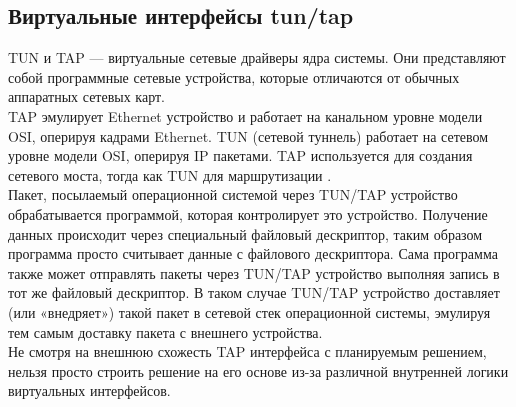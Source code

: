 \documentclass[14pt, a4paper]{extarticle}
\begin{document}
\subsection{Виртуальные интерфейсы tun/tap}
TUN и TAP — виртуальные сетевые драйверы ядра системы. Они представляют собой программные сетевые устройства, которые отличаются от обычных аппаратных сетевых карт. \\
\indent TAP эмулирует Ethernet устройство и работает на канальном уровне модели OSI, оперируя кадрами Ethernet. TUN (сетевой туннель) работает на сетевом уровне модели OSI, оперируя IP пакетами. TAP используется для создания сетевого моста, тогда как TUN для маршрутизации \cite{tuntap}. \\
\indent Пакет, посылаемый операционной системой через TUN/TAP устройство обрабатывается программой, которая контролирует это устройство. Получение данных происходит через специальный файловый дескриптор, таким образом программа просто считывает данные с файлового дескриптора. Сама программа также может отправлять пакеты через TUN/TAP устройство выполняя запись в тот же файловый дескриптор. В таком случае TUN/TAP устройство доставляет (или «внедряет») такой пакет в сетевой стек операционной системы, эмулируя тем самым доставку пакета с внешнего устройства. \\
\indent Не смотря на внешнюю схожесть TAP интерфейса с планируемым решением, нельзя просто строить решение на его основе из-за различной внутренней логики виртуальных интерфейсов.
\end{document}
